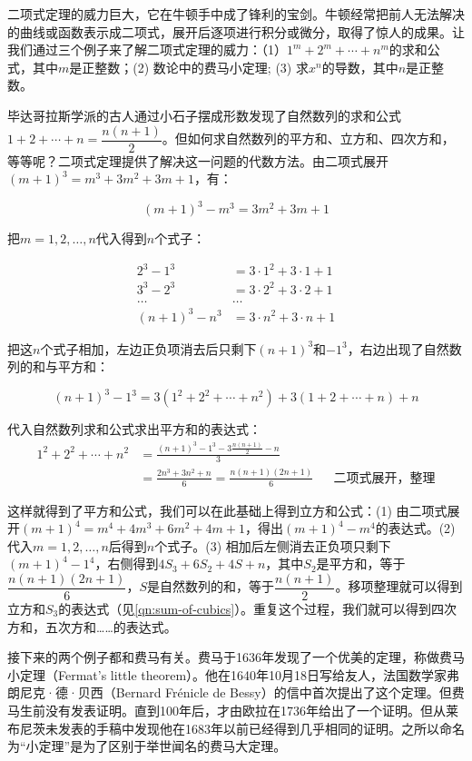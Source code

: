 \documentclass[b5paper]{ctexart}
\begin{document}
二项式定理的威力巨大，它在牛顿手中成了锋利的宝剑。牛顿经常把前人无法解决的曲线或函数表示成二项式，展开后逐项进行积分或微分，取得了惊人的成果。让我们通过三个例子来了解二项式定理的威力：（1）$1^m + 2^m + \dotsb  + n^m$的求和公式，其中$m$是正整数；(2) 数论中的费马小定理; (3) 求$x^n$的导数，其中$n$是正整数。

毕达哥拉斯学派的古人通过小石子摆成形数发现了自然数列的求和公式$1 + 2 + \dotsb + n = \dfrac{n(n+1)}{2}$。但如何求自然数列的平方和、立方和、四次方和，等等呢？二项式定理提供了解决这一问题的代数方法。由二项式展开$(m + 1)^3 = m^3 + 3m^2 + 3m + 1$，有：

\[
(m + 1)^3 - m^3 = 3m^2 + 3m + 1
\]

把$m = 1, 2, \dotsc, n$代入得到$n$个式子：

\begin{align*}
2^3 - 1^3 &= 3\cdot1^2 + 3\cdot1 + 1 \\
3^3 - 2^3 &= 3\cdot2^2 + 3\cdot2 + 1 \\
\dotso & \dotso \\
(n+1)^3 - n^3 &= 3\cdot n^2 + 3\cdot n + 1
\end{align*}

把这$n$个式子相加，左边正负项消去后只剩下$(n+1)^3$和$-1^3$，右边出现了自然数列的和与平方和：

\[
(n+1)^3 - 1^3 = 3(1^2 + 2^2 + \dotsb + n^2) + 3(1 + 2 + \dotsb + n) + n
\]

代入自然数列求和公式求出平方和的表达式：
\begin{align*}
1^2 + 2^2 + \dotsb + n^2 &= \frac{(n+1)^3 - 1^3 - 3\frac{n(n+1)}{2} - n}{3} \\
 &= \frac{2n^3 + 3n^2 + n}{6} = \frac{n(n+1)(2n+1)}{6} && \text{二项式展开，整理}
\end{align*}

这样就得到了平方和公式，我们可以在此基础上得到立方和公式：(1) 由二项式展开$(m + 1)^4 = m^4 + 4m^3 + 6m^2 + 4m + 1$，得出$(m + 1)^4 - m^4$的表达式。(2) 代入$m = 1, 2, \dotsc, n$后得到$n$个式子。(3) 相加后左侧消去正负项只剩下$(m + 1)^4 - 1^4$，右侧得到$4S_3 + 6S_2 + 4S + n$，其中$S_2$是平方和，等于$\dfrac{n(n+1)(2n+1)}{6}$，$S$是自然数列的和，等于$\dfrac{n(n+1)}{2}$。移项整理就可以得到立方和$S_3$的表达式（见\cref{qn:sum-of-cubics}）。重复这个过程，我们就可以得到四次方和，五次方和……的表达式。

接下来的两个例子都和费马有关。费马于1636年发现了一个优美的定理，称做费马小定理（Fermat's little theorem）。他在1640年10月18日写给友人，法国数学家弗朗尼克·德·贝西（Bernard Frénicle de Bessy）的信中首次提出了这个定理。但费马生前没有发表证明。直到100年后，才由欧拉在1736年给出了一个证明。但从莱布尼茨未发表的手稿中发现他在1683年以前已经得到几乎相同的证明。之所以命名为“小定理”是为了区别于举世闻名的费马大定理。
\end{document}
